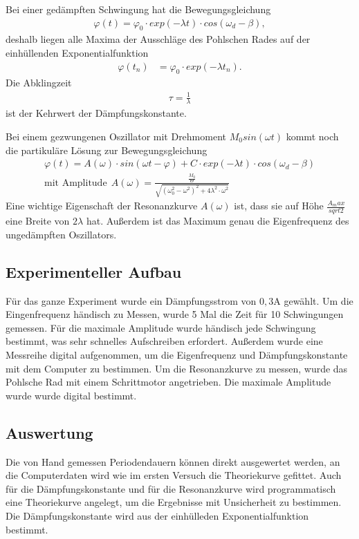 \documentclass[11pt, a4paper]{article}
\begin{document}
    Bei einer gedämpften Schwingung hat die Bewegungsgleichung
    \begin{align}
        \varphi(t) = \varphi_0 \cdot exp(-\lambda t) \cdot cos(\omega_d - \beta), \label{theo5}
    \end{align}
    deshalb liegen alle Maxima der Ausschläge des Pohlschen Rades auf der einhüllenden Exponentialfunktion
    \begin{align}
        \varphi(t_n) &= \varphi_0 \cdot exp(-\lambda t_n).
    \end{align}
    Die Abklingzeit
    \begin{align}
        \tau = \frac{1}{\lambda}
    \end{align}
    ist der Kehrwert der Dämpfungskonstante.

    Bei einem gezwungenen Oszillator mit Drehmoment $M_0 sin(\omega t)$ kommt noch die partikuläre Lösung zur Bewegungsgleichung
    \begin{align}
        \varphi(t) = A(\omega) \cdot sin(\omega t - \varphi) + C \cdot exp(-\lambda t) \cdot cos(\omega_d - \beta) \\
        \text{mit Amplitude}  \ \ A(\omega) = \frac{\frac{M_0}{\Theta}}{\sqrt{\left( \omega_0^2 - \omega^2 \right)^2 + 4 \lambda^2 \cdot \omega^2}} \label{aomega}
    \end{align}
    Eine wichtige Eigenschaft der Resonanzkurve $A(\omega)$ ist, dass sie auf Höhe $\frac{A_max}{sqrt{2}}$ eine Breite von $2\lambda$ hat.
    Außerdem ist das Maximum genau die Eigenfrequenz des ungedämpften Oszillators.

    \subsection{Experimenteller Aufbau}
    Für das ganze Experiment wurde ein Dämpfungsstrom von $0,3 \si{\ampere}$ gewählt.
    Um die Eingenfrequenz händisch zu Messen, wurde 5 Mal die Zeit für 10 Schwingungen gemessen.
    Für die maximale Amplitude wurde händisch jede Schwingung bestimmt, was sehr schnelles Aufschreiben erfordert.
    Außerdem wurde eine Messreihe digital aufgenommen, um die Eigenfrequenz und Dämpfungskonstante mit dem Computer zu bestimmen.
    Um die Resonanzkurve zu  messen, wurde das Pohlsche Rad mit einem Schrittmotor angetrieben. Die maximale Amplitude wurde
    wurde digital bestimmt.

    \subsection{Auswertung}
    Die von Hand gemessen Periodendauern können direkt ausgewertet werden, an die Computerdaten
    wird wie im ersten Versuch die Theoriekurve gefittet. Auch für die Dämpfungskonstante und für die
    Resonanzkurve wird programmatisch eine Theoriekurve angelegt, um die Ergebnisse mit Unsicherheit
    zu bestimmen. Die Dämpfungskonstante wird aus der einhülleden Exponentialfunktion bestimmt.
\end{document}

